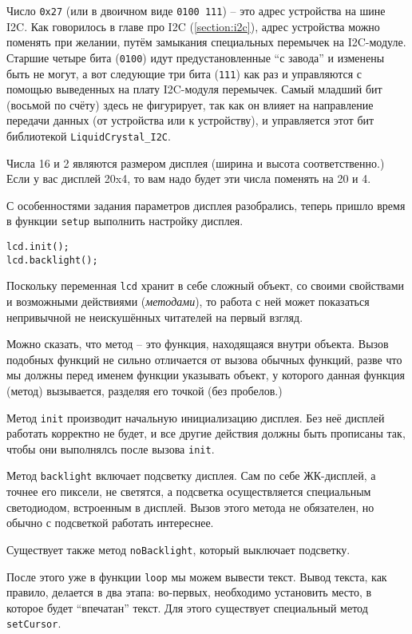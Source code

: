 \documentclass[../sparc.tex]{subfiles}
\begin{document}
Число \texttt{0x27} (или в двоичном виде \texttt{0100 111}) -- это адрес
устройства на шине I2C.  Как говорилось в главе про I2C (\ref{section:i2c}),
адрес устройства можно поменять при желании, путём замыкания специальных
перемычек на I2C-модуле.  Старшие четыре бита (\texttt{0100}) идут
предустановленные ``с завода'' и изменены быть не могут, а вот следующие три
бита (\texttt{111}) как раз и управляются с помощью выведенных на плату
I2C-модуля перемычек.  Самый младший бит (восьмой по счёту) здесь не фигурирует,
так как он влияет на направление передачи данных (от устройства или к
устройству), и управляется этот бит библиотекой \texttt{LiquidCrystal\_I2C}.

Числа 16 и 2 являются размером дисплея (ширина и высота соответственно.)  Если у
вас дисплей 20x4, то вам надо будет эти числа поменять на 20 и 4.

С особенностями задания параметров дисплея разобрались, теперь пришло время в
функции \texttt{setup} выполнить настройку дисплея.

\begin{verbatim}
lcd.init();
lcd.backlight();
\end{verbatim}

Поскольку переменная \texttt{lcd} хранит в себе сложный объект, со своими
свойствами и возможными действиями (\emph{методами}), то работа с ней может показаться
непривычной не неискушённых читателей на первый взгляд.

Можно сказать, что \gls{метод} -- это функция, находящаяся внутри объекта.
Вызов подобных функций не сильно отличается от вызова обычных функций, разве что
мы должны перед именем функции указывать объект, у которого данная функция
(метод) вызывается, разделяя его точкой (без пробелов.)

Метод \texttt{init} производит начальную инициализацию дисплея.  Без неё дисплей
работать корректно не будет, и все другие действия должны быть прописаны так,
чтобы они выполнялсь после вызова \texttt{init}.

Метод \texttt{backlight} включает подсветку дисплея.  Сам по себе ЖК-дисплей, а
точнее его пиксели, не светятся, а подсветка осуществляется специальным
светодиодом, встроенным в дисплей.  Вызов этого метода не обязателен, но обычно
с подсветкой работать интереснее.

Существует также метод \texttt{noBacklight}, который выключает подсветку.

После этого уже в функции \texttt{loop} мы можем вывести текст.  Вывод текста,
как правило, делается в два этапа: во-первых, необходимо установить место, в
которое будет ``впечатан'' текст.  Для этого существует специальный метод
\texttt{setCursor}.
\end{document}
